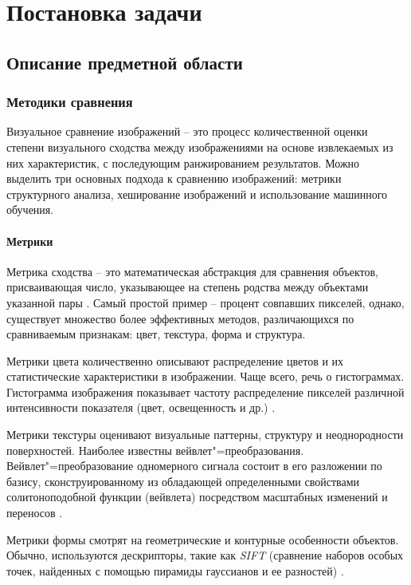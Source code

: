 \chapter{Постановка задачи}

\section{Описание предметной области}

\subsection{Методики сравнения}
Визуальное сравнение изображений -- это процесс количественной оценки степени
визуального сходства между изображениями на основе извлекаемых из них
характеристик, с последующим ранжированием результатов. Можно выделить три
основных подхода к сравнению изображений: метрики структурного анализа,
хеширование изображений и использование машинного обучения.

\subsubsection{Метрики}
Метрика сходства -- это математическая абстракция для сравнения объектов,
присваивающая число, указывающее на степень родства между объектами указанной
пары \cite{ali2016survey}. Самый простой пример -- процент совпавших пикселей,
однако, существует множество более эффективных методов, различающихся по
сравниваемым признакам: цвет, текстура, форма и структура.

Метрики цвета количественно описывают распределение цветов и их статистические
характеристики в изображении. Чаще всего, речь о гистограммах. Гистограмма
изображения показывает частоту распределение пикселей различной интенсивности
показателя (цвет, освещенность и др.) \cite{ali2016survey}.

Метрики текстуры оценивают визуальные паттерны, структуру и неоднородности
поверхностей. Наиболее известны вейвлет"=преобразования. Вейвлет"=преобразование
одномерного сигнала состоит в его разложении по базису, сконструированному из
обладающей определенными свойствами солитоноподобной функции (вейвлета)
посредством масштабных изменений и переносов \cite{астафьева1996вейвлет}.

Метрики формы смотрят на геометрические и контурные особенности объектов.
Обычно, используются дескрипторы, такие как \textit{SIFT} (сравнение наборов
особых точек, найденных с помощью пирамиды гауссианов и ее разностей)
\cite{lowe2004distinctive}.

